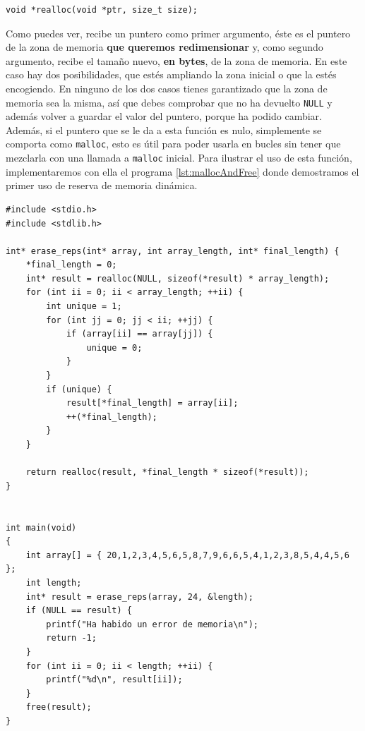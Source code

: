 \documentclass[a4paper]{article}
\begin{document}
\noindent
\begin{minipage}[H]{\linewidth}
\mbox{}
\begin{lstlisting}[style=C,
caption={Declaración de la función \texttt{realloc}},
label={lst:callocSignature}]
void *realloc(void *ptr, size_t size);
\end{lstlisting}
\end{minipage}
Como puedes ver, recibe un puntero como primer argumento, éste es el puntero
de la zona de memoria \textbf{que queremos redimensionar} y, como segundo argumento,
recibe el tamaño nuevo, \textbf{en bytes}, de la zona de memoria. En este caso hay
dos posibilidades, que estés ampliando la zona inicial o que la estés
encogiendo. En ninguno de los dos casos tienes garantizado que la zona de
memoria sea la misma, así que debes comprobar que no ha devuelto \verb!NULL! y
además volver a guardar el valor del puntero, porque ha podido cambiar.
Además, si el puntero que se le da a esta función es nulo, simplemente se
comporta como \verb!malloc!, esto es útil para poder usarla en bucles sin tener
que mezclarla con una llamada a \verb!malloc! inicial.
Para ilustrar el uso de esta función, implementaremos con ella el programa
\ref{lst:mallocAndFree} donde demostramos el primer uso de reserva de memoria
dinámica.

\noindent
\begin{minipage}[H]{\linewidth}
\mbox{}
\begin{lstlisting}[style=C, label={lst:reallocExample},
caption={Utilización de \texttt{realloc}}]
#include <stdio.h>
#include <stdlib.h>

int* erase_reps(int* array, int array_length, int* final_length) {
    *final_length = 0;
    int* result = realloc(NULL, sizeof(*result) * array_length);
    for (int ii = 0; ii < array_length; ++ii) {
        int unique = 1;
        for (int jj = 0; jj < ii; ++jj) {
            if (array[ii] == array[jj]) {
                unique = 0;
            }
        }
        if (unique) {
            result[*final_length] = array[ii];
            ++(*final_length);
        }
    }

    return realloc(result, *final_length * sizeof(*result));
}


int main(void)
{
    int array[] = { 20,1,2,3,4,5,6,5,8,7,9,6,6,5,4,1,2,3,8,5,4,4,5,6 };
    int length;
    int* result = erase_reps(array, 24, &length);
    if (NULL == result) {
        printf("Ha habido un error de memoria\n");
        return -1;
    }
    for (int ii = 0; ii < length; ++ii) {
        printf("%d\n", result[ii]);
    }
    free(result);
}
\end{lstlisting}
\end{minipage}
\end{document}
